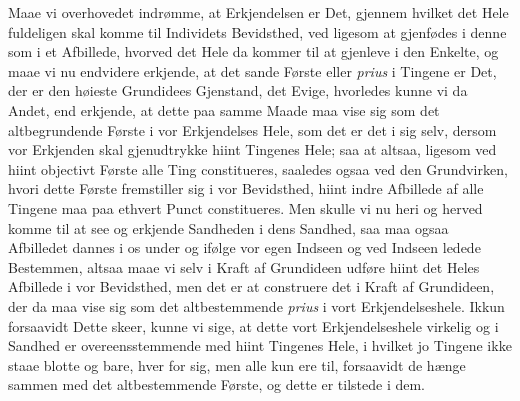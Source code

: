 \documentclass[12pt,a4paper]{book}
\begin{document}
{\small Maae vi overhovedet indrømme, at Erkjendelsen er Det, gjennem hvilket det
Hele fuldeligen skal komme til Individets Bevidsthed, ved ligesom at gjenfødes i
denne som i et Afbillede, hvorved det Hele da kommer til at gjenleve i den Enkelte,
og maae vi nu endvidere erkjende, at det sande Første eller \textit{prius} i Tingene
er Det, der er den høieste Grundidees Gjenstand, det Evige, hvorledes kunne vi da
Andet, end erkjende, at dette paa samme Maade maa vise sig som det altbegrundende
Første i vor Erkjendelses Hele, som det er det i sig selv, dersom vor Erkjenden skal
gjenudtrykke hiint Tingenes Hele; saa at altsaa, ligesom ved hiint objectivt Første
alle Ting constitueres, saaledes ogsaa ved den Grundvirken, hvori dette Første
fremstiller sig i vor Bevidsthed, hiint indre Afbillede af alle Tingene maa paa
ethvert Punct constitueres. Men skulle vi nu heri og herved komme til at see og
erkjende Sandheden i dens Sandhed, saa maa ogsaa Afbilledet dannes i os under og
ifølge vor egen Indseen og ved Indseen ledede Bestemmen, altsaa maae vi selv i Kraft
af Grundideen udføre hiint det Heles Afbillede i vor Bevidsthed, men det er at
construere det i Kraft af Grundideen, der da maa vise sig som det altbestemmende
\textit{prius} i vort Erkjendelseshele. Ikkun forsaavidt Dette skeer, kunne vi sige,
at dette vort Erkjendelseshele virkelig og i Sandhed er overeensstemmende med hiint
Tingenes Hele, i hvilket jo Tingene ikke staae blotte og bare, hver for sig, men
alle kun ere til, forsaavidt de hænge sammen med det altbestemmende Første, og dette
er tilstede i dem.\par}
\end{document}
